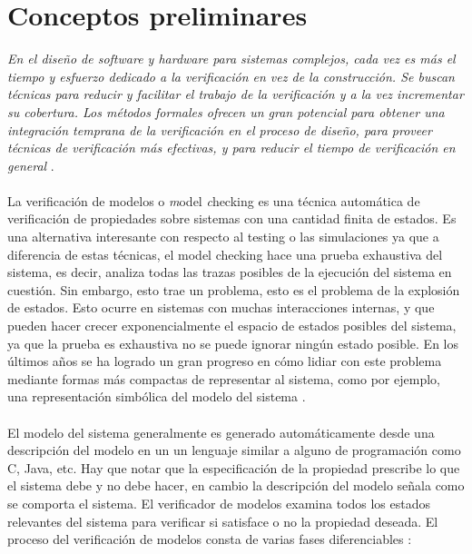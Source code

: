 \chapter{Conceptos preliminares}

\textit{En el diseño de software y hardware para sistemas complejos, cada vez es más el tiempo y esfuerzo dedicado a la verificación en vez de la construcción. Se buscan técnicas para reducir y facilitar el trabajo de la verificación y a la vez incrementar su cobertura. Los métodos formales ofrecen un gran potencial para obtener una integración temprana de la verificación en el proceso de diseño, para proveer técnicas de verificación más efectivas, y para reducir el tiempo de verificación en general} \cite{Baier:2}.\\
\\
La verificación de modelos o \emph model \emph checking es una técnica automática de verificación de propiedades sobre sistemas con una cantidad finita de estados. Es una alternativa interesante con respecto al testing o las simulaciones ya que a diferencia de estas técnicas, el model checking hace una prueba exhaustiva del sistema, es decir, analiza todas las trazas posibles de la ejecución del sistema en cuestión. Sin embargo, esto trae un problema, esto es el problema de la explosión de estados. Esto ocurre en sistemas con muchas interacciones internas, y que pueden hacer crecer exponencialmente el espacio de estados posibles del sistema, ya que la prueba es exhaustiva no se puede ignorar ningún estado posible. En los últimos años se ha logrado un gran progreso en cómo lidiar con este problema mediante formas más compactas de representar al sistema, como por ejemplo, una representación simbólica del modelo del sistema \cite{Bryant:8} \cite{Burch:4}.\\
\\
El modelo del sistema generalmente es generado automáticamente desde una descripción del modelo en un un lenguaje similar a alguno de programación como C, Java, etc. Hay que notar que la especificación de la propiedad prescribe lo que el sistema debe y no debe hacer, en cambio la descripción del modelo señala como se comporta el sistema. El verificador de modelos examina todos los estados relevantes del sistema para verificar si satisface o no la propiedad deseada. El proceso del verificación de modelos consta de varias fases diferenciables \cite{Baier:2}:\\
